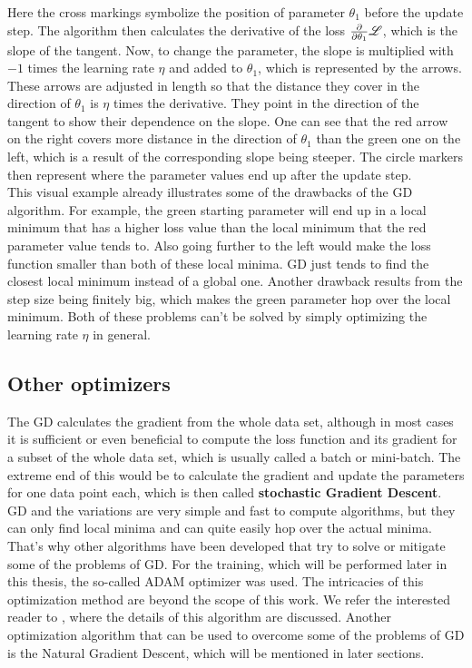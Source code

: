 Here the cross markings symbolize the position of parameter $\theta_1$ before the update step. The algorithm then calculates the derivative of the loss $\frac{\partial}{\partial\theta_1} \mathscr{L}$, which is the slope of the tangent. Now, to change the parameter, the slope is multiplied with $-1$ times the learning rate $\eta$ and added to $\theta_1$, which is represented by the arrows. These arrows are adjusted in length so that the distance they cover in the direction of $\theta_1$ is $\eta$ times the derivative. They point in the direction of the tangent to show their dependence on the slope. One can see that the red arrow on the right covers more distance in the direction of $\theta_1$ than the green one on the left, which is a result of the corresponding slope being steeper. The circle markers then represent where the parameter values end up after the update step.\\
This visual example already illustrates some of the drawbacks of the GD algorithm. For example, the green starting parameter will end up in a local minimum that has a higher loss value than the local minimum that the red parameter value tends to. Also going further to the left would make the loss function smaller than both of these local minima. GD just tends to find the closest local minimum instead of a global one. Another drawback results from the step size being finitely big, which makes the green parameter hop over the local minimum. Both of these problems can't be solved by simply optimizing the learning rate $\eta$ in general.

\subsection{Other optimizers}
The GD calculates the gradient from the whole data set, although in most cases it is sufficient or even beneficial to compute the loss function and its gradient for a subset of the whole data set, which is usually called a batch or mini-batch. The extreme end of this would be to calculate the gradient and update the parameters for one data point each, which is then called \textbf{stochastic Gradient Descent}.
GD and the variations are very simple and fast to compute algorithms, but they can only find local minima and can quite easily hop over the actual minima. That's why other algorithms have been developed that try to solve or mitigate some of the problems of GD. For the training, which will be performed later in this thesis, the so-called ADAM optimizer was used. The intricacies of this optimization method are beyond the scope of this work. We refer the interested reader to \cite{adamPaper}, where the details of this algorithm are discussed. Another optimization algorithm that can be used to overcome some of the problems of GD is the Natural Gradient Descent, which will be mentioned in later sections.


